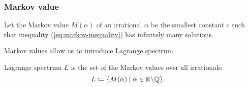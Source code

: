 \begin{frame}
\frametitle{Markov value}

\begin{definition}
	Let the Markov value $M(\alpha)$ of an irrational $\alpha$ be
	the smallest constant $c$ such that inequality (\ref{eq:markov-inequality}) has infinitely many solutions.
\end{definition}


Markov values allow us to introduce Lagrange spectrum.

\begin{definition}
	Lagrange spectrum $L$ is the set of the Markov values over all irrationals:
	\begin{equation*}
		L \coloneqq \{M(\alpha) \mid \alpha \in \mathbb{R} \backslash \mathbb{Q}\}.
	\end{equation*}
\end{definition}

\end{frame}

